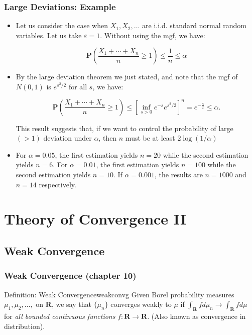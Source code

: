 \documentclass[handout]{beamer}
\newcommand{\BP}{\mathbf{P}}
\begin{document}
\frame
{
  \frametitle{Large Deviations: Example} 

   \begin{itemize}

                 \item<1-> Let us consider the case when $X_1, X_2,\ldots$ are i.i.d. standard normal random variables. Let us take $\varepsilon=1$. Without using the mgf, we have:
                 
      $$\BP(\frac{X_1+\cdots+X_n}{n}\geq 1)\leq  \frac{1}{  n} \le \alpha$$

                 \item<2-> By the large deviation theorem we just stated, and note that the mgf of  $N(0,1)$ is $e^{s^2/2}$ for all $s$, we have:
                 
                       $$\BP\left(\frac{X_1+\cdots+X_n}{n}\geq 1 \right)\leq  [\inf_{s>0} e^{-s} e^{s^2/2}]^n=e^{-\frac{n }{2}} \le \alpha.$$
                       
                       This result suggests that, if we want to control the probability of large $(>1)$ deviation under $\alpha$, then $n$ must be at least $2\log (1/\alpha)$



                 \item<3-> For $\alpha=0.05$, the first estimation yields $n=20$ while the second estimation yields $n=6$. For $\alpha=0.01$, the first estimation yields $n=100$ while the second estimation yields $n=10$.  If $\alpha=0.001$, the results are $n=1000$ and $n=14$ respectively. 
                            \end{itemize}
}

\section{Theory of Convergence II}
\subsection{Weak Convergence}


\frame
{
  \frametitle{Weak Convergence (chapter 10) } 

\begin{mytheo}{Definition: Weak Convergence}{weakconvg}
Given Borel probability measures $\mu_1, \mu_2,\ldots, $ on $\mathbf{R}$, we say that $\{\mu_n \}$ converges weakly to $\mu$ if $\int_{\mathbf{R}} f d\mu_n \rightarrow \int_{\mathbf{R}}f d\mu$ for \textit{all bounded continuous functions} $f:\mathbf{R}\rightarrow \mathbf{R}$. (Also known as convergence in distribution). 
\end{mytheo}



}
\end{document}
